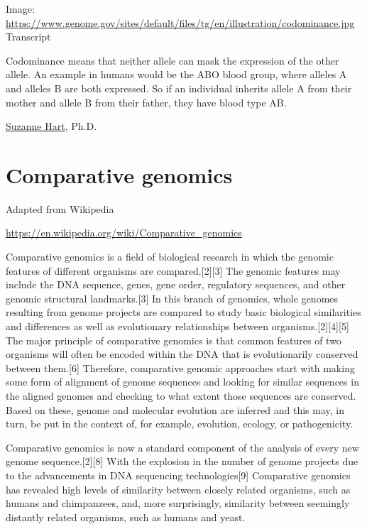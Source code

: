 \documentclass[
]{book}
\begin{document}
Image: \url{https://www.genome.gov/sites/default/files/tg/en/illustration/codominance.jpg}
Transcript

Codominance means that neither allele can mask the expression of the other allele. An example in humans would be the ABO blood group, where alleles A and alleles B are both expressed. So if an individual inherits allele A from their mother and allele B from their father, they have blood type AB.

\href{https://www.genome.gov/staff/Suzanne-Hart-PhD}{Suzanne Hart}, Ph.D.

\hypertarget{comparative-genomics}{%
\section{Comparative genomics}\label{comparative-genomics}}

Adapted from Wikipedia

\url{https://en.wikipedia.org/wiki/Comparative_genomics}

Comparative genomics is a field of biological research in which the genomic features of different organisms are compared.{[}2{]}{[}3{]} The genomic features may include the DNA sequence, genes, gene order, regulatory sequences, and other genomic structural landmarks.{[}3{]} In this branch of genomics, whole genomes resulting from genome projects are compared to study basic biological similarities and differences as well as evolutionary relationships between organisms.{[}2{]}{[}4{]}{[}5{]} The major principle of comparative genomics is that common features of two organisms will often be encoded within the DNA that is evolutionarily conserved between them.{[}6{]} Therefore, comparative genomic approaches start with making some form of alignment of genome sequences and looking for similar sequences in the aligned genomes and checking to what extent those sequences are conserved. Based on these, genome and molecular evolution are inferred and this may, in turn, be put in the context of, for example, evolution, ecology, or pathogenicity.

Comparative genomics is now a standard component of the analysis of every new genome sequence.{[}2{]}{[}8{]} With the explosion in the number of genome projects due to the advancements in DNA sequencing technologies{[}9{]} Comparative genomics has revealed high levels of similarity between closely related organisms, such as humans and chimpanzees, and, more surprisingly, similarity between seemingly distantly related organisms, such as humans and yeast.
\end{document}
